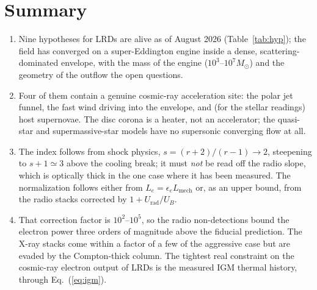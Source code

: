 \documentclass[11pt,a4paper]{article}
\begin{document}
\section{Summary}
\begin{enumerate}
\item Nine hypotheses for LRDs are alive as of August 2026
      (Table~\ref{tab:hyp}); the field has converged on a super-Eddington engine
      inside a dense, scattering-dominated envelope, with the mass of the engine
      ($10^{3}$--$10^{7}M_\odot$) and the geometry of the outflow the open
      questions.
\item Four of them contain a genuine cosmic-ray acceleration site: the polar
      jet funnel, the fast wind driving into the envelope, and (for the stellar
      readings) host supernovae. The disc corona is a heater, not an
      accelerator; the quasi-star and supermassive-star models have no
      supersonic converging flow at all.
\item The index follows from shock physics, $s=(r+2)/(r-1)\to2$, steepening to
      $s+1\simeq3$ above the cooling break; it must \emph{not} be read off the
      radio slope, which is optically thick in the one case where it has been
      measured. The normalization follows either from
      $L_e=\epsilon_e L_{\mathrm{mech}}$ or, as an upper bound, from the radio
      stacks corrected by $1+U_{\mathrm{rad}}/U_B$.
\item That correction factor is $10^{2}$--$10^{5}$, so the radio non-detections
      bound the electron power three orders of magnitude above the fiducial
      prediction. The X-ray stacks come within a factor of a few of the
      aggressive case but are evaded by the Compton-thick column. The tightest
      real constraint on the cosmic-ray electron output of LRDs is the measured
      IGM thermal history, through Eq.~(\ref{eq:igm}).
\end{enumerate}

\end{document}
